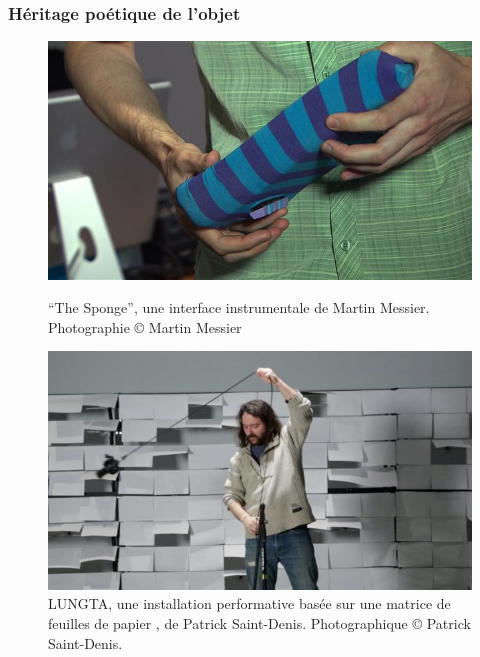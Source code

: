 \subsubsection{Héritage poétique de l'objet}
\begin{figure}[!htbp]
	\captionsetup{format=plain}%
	\centering
	\begin{minipage}[t]{0.48\textwidth}
		\includegraphics[width=\linewidth]{gfx/05_interfaces/Marier-Sponge.jpg}
		\caption[``The Sponge'' de Martin Messier]{``The Sponge'', une interface instrumentale de Martin Messier. Photographie © Martin Messier}
		\label{fig:interface:filigramophone-adhesif}
	\end{minipage}
	\hspace{.02\linewidth}
	\begin{minipage}[t]{0.48\textwidth}
	    \includegraphics[width=\linewidth]{gfx/05_interfaces/Saint-Denis-Lungta.jpg}
		\caption[LUNGTA de Patrick Saint-Denis]{LUNGTA, une installation performative basée sur une matrice de feuilles de papier , de Patrick Saint-Denis. Photographique © Patrick Saint-Denis.}
		\label{fig:interface:lungta}
	\end{minipage}
\end{figure}

